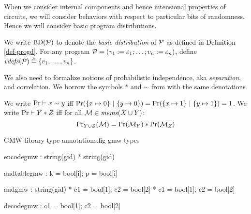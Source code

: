 When we consider internal components and hence intensional properties
of circuits, we will consider behaviors with respect to particular bits
of randomness. Hence we will consider basic program distributions. 
\begin{definition}
  We write $\mathrm{BD}(\mathcal{P})$ to denote the \emph{basic distribution} of
  $\mathcal{P}$ as defined in Definition \ref{def-progd}. For any program $\mathcal{P} =
  (v_1 := \varepsilon_1;\ldots;v_n := \varepsilon_n)$, define
  $\mathit{vdefs}(\mathcal{P}) \triangleq \{ v_1,\ldots,v_n \}$.
\end{definition}
We also need to formalize notions of probabilistic independence, aka
\emph{separation}, and correlation. We borrow the symbols $*$ and $\sim$
from \cite{barthe2019probabilistic} with the same denotations.
\begin{definition}
  We write $\mathrm{Pr} \vdash x \sim y$ iff $\mathrm{Pr}(\{ x \mapsto 0\}\ |\ \{ y \mapsto 0 \}) =
  \mathrm{Pr}(\{ x \mapsto 1\}\ |\ \{ y \mapsto 1 \}) = 1$.
  We write $\mathrm{Pr} \vdash Y * Z$ iff for all
    $\mathcal{M} \in \mathit{mems}(X \cup Y)$:
  $${\mathrm{Pr}}_{Y \cup Z}(\mathcal{M}) =
  \mathrm{Pr}(\mathcal{M}_Y) * \mathrm{Pr}(\mathcal{M}_Z)$$ 
\end{definition}

\begin{fpfig}[t]{GMW library type annotations.}{fig-gmw-types}
{\footnotesize
  \begin{verbatimtab}
   encodegmw   : string(gid) * string(gid)
    
   andtablegmw : { k = bool[i]; p = bool[i] }
    
   andgmw      : string(gid) *  { c1 = bool[1]; c2 = bool[2] } * { c1 = bool[1]; c2 = bool[2] }
    
   decodegmw   : { c1 = bool[1]; c2 = bool[2] }  \end{verbatimtab}
}
\end{fpfig}

